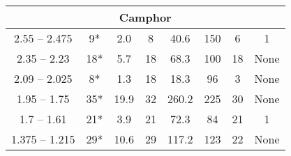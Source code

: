 \begin{landscape}
\begin{longtable}{cccccccc}

        \hline
        \multicolumn{8}{c}{\textbf{Camphor}}\\
        \hline
        2.55 -- 2.475 &
        9* &
        2.0 &
        8 &
        40.6 &
        150 &
        6 &
        1 \\
        2.35 -- 2.23 &
        18* &
        5.7 &
        18 &
        68.3 &
        100 &
        18 &
        None\\
        2.09 -- 2.025 &
        8* &
        1.3 &
        18 &
        18.3 &
        96 &
        3 &
        None\\
        1.95 -- 1.75 &
        35* &
        19.9 &
        32 &
        260.2 &
        225 &
        30 &
        None\\
        1.7 -- 1.61 &
        21* &
        3.9 &
        21 &
        72.3 &
        84 &
        21 &
        1 \\
        1.375 -- 1.215 &
        29* &
        10.6 &
        29 &
        117.2 &
        123 &
        22 &
        None\\


\end{longtable}
\end{landscape}
